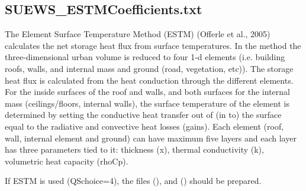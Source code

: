 \documentclass[letterpaper,10pt,english]{sphinxmanual}
\begin{document}
\subsection{SUEWS\_ESTMCoefficients.txt}
\label{\detokenize{input_files/ESTM_related_files/ESTM_related_files:suews-estmcoefficients-txt}}\label{\detokenize{input_files/ESTM_related_files/ESTM_related_files:id1}}

The Element Surface Temperature Method (ESTM) (Offerle et al., 2005)
calculates the net storage heat flux from surface temperatures. In the
method the three-dimensional urban volume is reduced to four 1-d
elements (i.e. building roofs, walls, and internal mass and ground
(road, vegetation, etc)). The storage heat flux is calculated from the
heat conduction through the different elements. For the inside surfaces
of the roof and walls, and both surfaces for the internal mass
(ceilings/floors, internal walls), the surface temperature of the
element is determined by setting the conductive heat transfer out of (in
to) the surface equal to the radiative and convective heat losses
(gains). Each element (roof, wall, internal element and ground) can have
maximum five layers and each layer has three parameters tied to it:
thickness (x), thermal conductivity (k), volumetric heat capacity
(rhoCp).

If ESTM is used (QSchoice=4), the files
{\hyperref[\detokenize{input_files/ESTM_related_files/ESTM_related_files:suews-estmcoefficients-txt}]{}} (),
 and
{\hyperref[\detokenize{input_files/ESTM_related_files/ESTM_related_files:ssss-yyyy-estm-ts-data-tt-txt}]{}} () should be
prepared.
\end{document}
